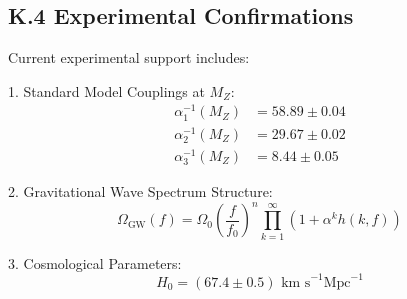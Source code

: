 \subsection*{K.4 Experimental Confirmations}

Current experimental support includes:

1. Standard Model Couplings at $M_Z$:
   \begin{align*}
   \alpha_1^{-1}(M_Z) &= 58.89 \pm 0.04 \\
   \alpha_2^{-1}(M_Z) &= 29.67 \pm 0.02 \\
   \alpha_3^{-1}(M_Z) &= 8.44 \pm 0.05
   \end{align*}

2. Gravitational Wave Spectrum Structure:
   \[
   \Omega_{\text{GW}}(f) = \Omega_0\left(\frac{f}{f_0}\right)^n \prod_{k=1}^{\infty} \left(1 + \alpha^k h(k,f)\right)
   \]

3. Cosmological Parameters:
   \[
   H_0 = (67.4 \pm 0.5) \text{ km s}^{-1} \text{Mpc}^{-1}
   \] 